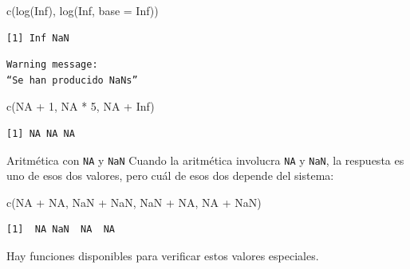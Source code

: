 \documentclass[
  ignorenonframetext,
  aspectratio=169,
  spanish,
]{beamer}
\newenvironment{Shaded}{\begin{snugshade}}{\end{snugshade}}
\newcommand{\AttributeTok}[1]{\textcolor[rgb]{0.40,0.45,0.13}{#1}}
\newcommand{\ConstantTok}[1]{\textcolor[rgb]{0.56,0.35,0.01}{#1}}
\newcommand{\DecValTok}[1]{\textcolor[rgb]{0.68,0.00,0.00}{#1}}
\newcommand{\FunctionTok}[1]{\textcolor[rgb]{0.28,0.35,0.67}{#1}}
\newcommand{\NormalTok}[1]{\textcolor[rgb]{0.00,0.23,0.31}{#1}}
\newcommand{\SpecialCharTok}[1]{\textcolor[rgb]{0.37,0.37,0.37}{#1}}
\begin{document}
\begin{frame}[fragile]{}
\label{section-6}
\begin{Shaded}
\begin{Highlighting}[]
\FunctionTok{c}\NormalTok{(}\FunctionTok{log}\NormalTok{(}\ConstantTok{Inf}\NormalTok{), }\FunctionTok{log}\NormalTok{(}\ConstantTok{Inf}\NormalTok{, }\AttributeTok{base =} \ConstantTok{Inf}\NormalTok{)) }
\end{Highlighting}
\end{Shaded}

\begin{verbatim}
[1] Inf NaN
\end{verbatim}

\begin{verbatim}
Warning message:
“Se han producido NaNs”
\end{verbatim}

\begin{Shaded}
\begin{Highlighting}[]
\FunctionTok{c}\NormalTok{(}\ConstantTok{NA} \SpecialCharTok{+} \DecValTok{1}\NormalTok{, }\ConstantTok{NA} \SpecialCharTok{*} \DecValTok{5}\NormalTok{, }\ConstantTok{NA} \SpecialCharTok{+} \ConstantTok{Inf}\NormalTok{)  }
\end{Highlighting}
\end{Shaded}

\begin{verbatim}
[1] NA NA NA
\end{verbatim}
\end{frame}

\begin{frame}[fragile]{Aritmética con \texttt{NA} y \texttt{NaN}}
\label{aritmuxe9tica-con-na-y-nan}
Cuando la aritmética involucra \texttt{NA} y \texttt{NaN}, la respuesta
es uno de esos dos valores, pero cuál de esos dos depende del sistema:

\begin{Shaded}
\begin{Highlighting}[]
\FunctionTok{c}\NormalTok{(}\ConstantTok{NA} \SpecialCharTok{+} \ConstantTok{NA}\NormalTok{, }\ConstantTok{NaN} \SpecialCharTok{+} \ConstantTok{NaN}\NormalTok{, }\ConstantTok{NaN} \SpecialCharTok{+} \ConstantTok{NA}\NormalTok{, }\ConstantTok{NA} \SpecialCharTok{+} \ConstantTok{NaN}\NormalTok{)}
\end{Highlighting}
\end{Shaded}

\begin{verbatim}
[1]  NA NaN  NA  NA
\end{verbatim}

Hay funciones disponibles para verificar estos valores especiales.
\end{frame}
\end{document}
